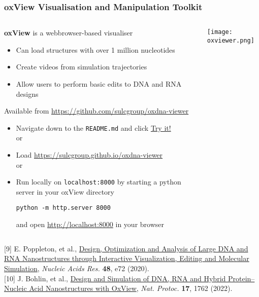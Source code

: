 \documentclass[slidestop,compress,9pt]{beamer}
\begin{document}
\begin{frame}[fragile]
\frametitle{oxView Visualisation and Manipulation Toolkit}
\small

\begin{columns}

\begin{column}{0.65\textwidth}
\textbf{oxView} is a webbrowser-based visualiser
\begin{itemize}
\item Can load structures with over 1 million nucleotides
\item Create videos from simulation trajectories
\item Allow users to perform basic edits to DNA and RNA designs
\end{itemize}
\vspace*{0.1cm}
Available from \href{https://github.com/sulcgroup/oxdna-viewer}{https://github.com/sulcgroup/oxdna-viewer}  
\begin{itemize}
\item Navigate down to the \texttt{README.md} and click \href{https://sulcgroup.github.io/oxdna-viewer}{Try it!}\\or
\item Load \href{https://sulcgroup.github.io/oxdna-viewer}{https://sulcgroup.github.io/oxdna-viewer}\\or
\item Run locally on \texttt{localhost:8000} by starting a python server in your oxView directory
\begin{lstlisting}
python -m http.server 8000
\end{lstlisting}
and open \href{http://localhost:8000}{http://localhost:8000} in your browser
\end{itemize}

\end{column}
\begin{column}{0.35\textwidth}
\begin{center}
\vspace*{-0.35cm}
\texttt{[image: oxviewer.png]}
\end{center}
\end{column}
\end{columns}

\vspace*{0.25cm}

[9] E. Poppleton, et al., \href{https://doi.org/10.1093/nar/gkaa417}{Design, Optimization and Analysis of Large DNA and RNA Nanostructures through Interactive Visualization, Editing and Molecular Simulation}, \textit{Nucleic Acids Res.} \textbf{48}, e72 (2020).\\[3pt]

[10] J. Bohlin, et al., \href{https://doi.org/10.1038/s41596-022-00688-5}{Design and Simulation of DNA, RNA and Hybrid Protein–Nucleic Acid Nanostructures with OxView}, \textit{Nat. Protoc.} \textbf{17}, 1762 (2022).


\end{frame}
\end{document}
